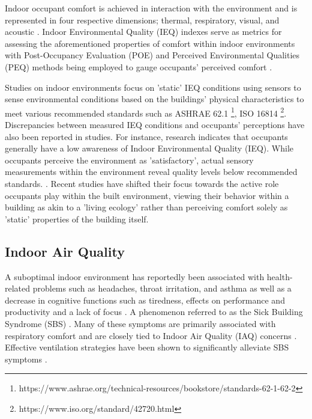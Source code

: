 Indoor occupant comfort is achieved in interaction with the environment and is represented in four respective dimensions; thermal, respiratory, visual, and acoustic \cite{alavi_comfort_2017}. Indoor Environmental Quality (IEQ) \cite{kulshreshtha_indoor_2024} indexes serve as metrics for assessing the aforementioned properties of comfort within indoor environments with Post-Occupancy Evaluation (POE) \cite{elsayed_post-occupancy_2023} and Perceived Environmental Qualities (PEQ) \cite{son_perceived_2023} methods being employed to gauge occupants' perceived comfort \cite{boissonneault_concepts_2023}. 

Studies on indoor environments focus on 'static' IEQ conditions using sensors to sense environmental conditions based on the buildings' physical characteristics to meet various recommended standards such as ASHRAE 62.1 \footnote{https://www.ashrae.org/technical-resources/bookstore/standards-62-1-62-2}, ISO 16814 \footnote{https://www.iso.org/standard/42720.html}. Discrepancies between measured IEQ conditions and occupants' perceptions have also been reported in studies. For instance, research indicates that occupants generally have a low awareness of Indoor Environmental Quality (IEQ). While occupants perceive the environment as 'satisfactory', actual sensory measurements within the environment reveal quality levels below recommended standards. \cite{son_perceived_2023}. Recent studies have shifted their focus towards the active role occupants play within the built environment, viewing their behavior within a building as akin to a 'living ecology' \cite{langevin_quantifying_2016} rather than perceiving comfort solely as 'static' properties of the building itself. 


\subsection{Indoor Air Quality}
\label{sec:iaq}

A suboptimal indoor environment has reportedly been associated with health-related problems such as headaches, throat irritation, and asthma \cite{klepeis_national_2001} as well as a decrease in cognitive functions such as tiredness, effects on performance and productivity and a lack of focus \cite{wang_how_2021} \cite{du_indoor_2020}. A phenomenon referred to as the Sick Building Syndrome (SBS) \cite{gawande_indoor_2020, passarelli_sick_2009}. Many of these symptoms are primarily associated with respiratory comfort and are closely tied to Indoor Air Quality (IAQ) concerns \cite{kim_analyzing_2019}. Effective ventilation strategies have been shown to significantly alleviate SBS symptoms \cite{gawande_indoor_2020}.

